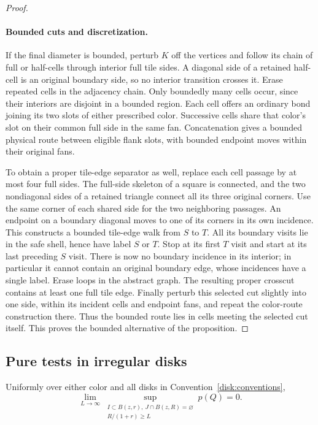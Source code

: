 \begin{proof}
\paragraph{Bounded cuts and discretization.}
If the final diameter is bounded, perturb $K$ off the vertices and
follow its chain of full or half-cells through interior full tile sides.
A diagonal side of a retained half-cell is an original boundary side,
so no interior transition crosses it.  Erase repeated cells in the
adjacency chain.  Only boundedly many cells occur, since their interiors
are disjoint in a bounded region.  Each cell offers an ordinary bond
joining its two slots of either prescribed color.  Successive cells
share that color's slot on their common full side in the same fan.
Concatenation gives a bounded physical route between eligible flank
slots, with bounded endpoint moves within their original fans.

To obtain a proper tile-edge separator as well, replace each cell
passage by at most four full sides.  The full-side skeleton of a square
is connected, and the two nondiagonal sides of a retained triangle
connect all its three original corners.  Use the same corner of each
shared side for the two neighboring passages.  An endpoint on a
boundary diagonal moves to one of its corners in its own incidence.
This constructs a bounded tile-edge walk from $S$ to $T$.  All its
boundary visits lie in the safe shell, hence have label $S$ or $T$.
Stop at its first $T$ visit and start at its last preceding $S$ visit.
There is now no boundary incidence in its interior; in particular it
cannot contain an original boundary edge, whose incidences have a
single label.  Erase loops in the abstract graph.  The resulting
proper crosscut contains at least one full tile edge.  Finally perturb
this selected cut slightly into one side, within its incident cells
and endpoint fans, and repeat the color-route construction there.
Thus the bounded route lies in cells meeting the selected cut itself.
This proves the bounded alternative of the proposition.

\end{proof}

\subsection{Pure tests in irregular disks}

\begin{theorem}\label{thm:pure-disk}
Uniformly over either color and all disks in
Convention~\ref{disk:conventions},
\[
 \lim_{L\to\infty}
 \sup_{\substack{I\subset B(z,r),\ J\cap B(z,R)=\varnothing\\
                  R/(1+r)\ge L}}
 p(Q)=0.
\]
\end{theorem}

